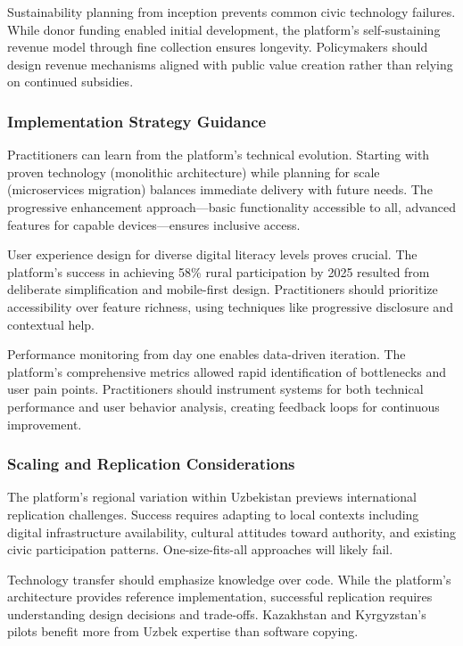 \documentclass[pdflatex,sn-mathphys-num]{sn-jnl}%
\theoremstyle{thmstyleone}%
\theoremstyle{thmstyletwo}%
\theoremstyle{thmstylethree}%
\begin{document}
Sustainability planning from inception prevents common civic technology failures. While donor funding enabled initial development, the platform's self-sustaining revenue model through fine collection ensures longevity. Policymakers should design revenue mechanisms aligned with public value creation rather than relying on continued subsidies.

\subsubsection{Implementation Strategy Guidance}

Practitioners can learn from the platform's technical evolution. Starting with proven technology (monolithic architecture) while planning for scale (microservices migration) balances immediate delivery with future needs. The progressive enhancement approach—basic functionality accessible to all, advanced features for capable devices—ensures inclusive access.

User experience design for diverse digital literacy levels proves crucial. The platform's success in achieving 58\% rural participation by 2025 resulted from deliberate simplification and mobile-first design. Practitioners should prioritize accessibility over feature richness, using techniques like progressive disclosure and contextual help.

Performance monitoring from day one enables data-driven iteration. The platform's comprehensive metrics allowed rapid identification of bottlenecks and user pain points. Practitioners should instrument systems for both technical performance and user behavior analysis, creating feedback loops for continuous improvement.

\subsubsection{Scaling and Replication Considerations}

The platform's regional variation within Uzbekistan previews international replication challenges. Success requires adapting to local contexts including digital infrastructure availability, cultural attitudes toward authority, and existing civic participation patterns. One-size-fits-all approaches will likely fail.

Technology transfer should emphasize knowledge over code. While the platform's architecture provides reference implementation, successful replication requires understanding design decisions and trade-offs. Kazakhstan and Kyrgyzstan's pilots benefit more from Uzbek expertise than software copying.
\end{document}
